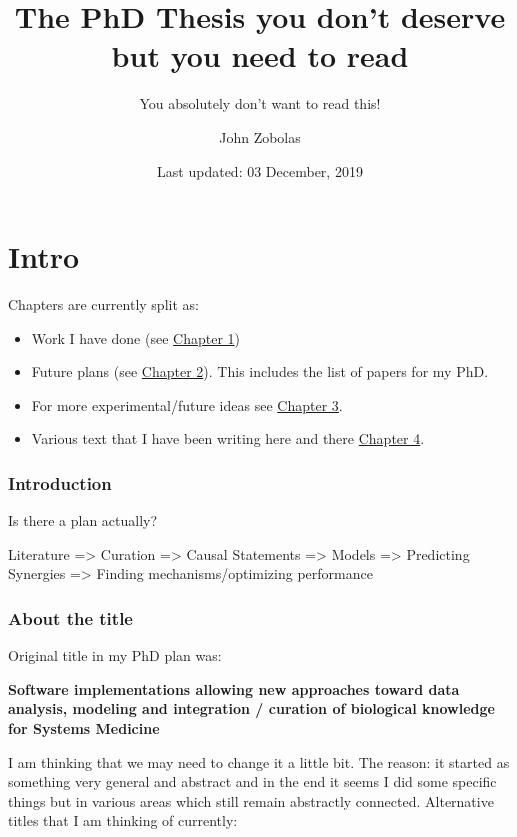 \documentclass[
  12pt,
]{book}
\title{The PhD Thesis you don't deserve but you need to read}
\subtitle{You absolutely don't want to read this!}
\author{John Zobolas}
\date{Last updated: 03 December, 2019}
\providecommand{\tightlist}{%
  \setlength{\itemsep}{0pt}\setlength{\parskip}{0pt}}
\begin{document}
\maketitle

{
\hypersetup{linkcolor=}
\setcounter{tocdepth}{1}
\tableofcontents
}
\listoftables
\listoffigures
\hypertarget{intro}{%
\chapter*{Intro}\label{intro}}

Chapters are currently split as:

\begin{itemize}
\tightlist
\item
  Work I have done (see \protect\hyperlink{work}{Chapter 1})
\item
  Future plans (see \protect\hyperlink{plans}{Chapter 2}). This includes the list of papers for my PhD.
\item
  For more experimental/future ideas see \protect\hyperlink{ideas}{Chapter 3}.
\item
  Various text that I have been writing here and there \protect\hyperlink{text}{Chapter 4}.
\end{itemize}

\hypertarget{introduction}{%
\subsection*{Introduction}\label{introduction}}

Is there a plan actually?

Literature =\textgreater{} Curation =\textgreater{} Causal Statements =\textgreater{} Models =\textgreater{} Predicting Synergies =\textgreater{} Finding mechanisms/optimizing performance

\hypertarget{about-the-title}{%
\subsection*{About the title}\label{about-the-title}}

Original title in my PhD plan was:

\textbf{Software implementations allowing new approaches toward data analysis, modeling and integration / curation of biological knowledge for Systems Medicine}

I am thinking that we may need to change it a little bit.
The reason: it started as something very general and abstract and in the end it seems I did some specific things but in various areas which still remain abstractly connected.
Alternative titles that I am thinking of currently:
\end{document}
